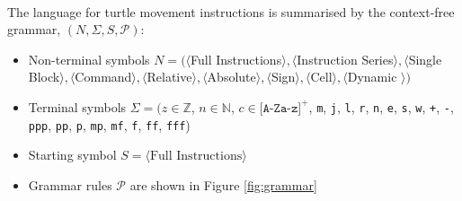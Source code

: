 \paragraph{} The language for turtle movement instructions is summarised by the context-free grammar, $(N,\Sigma,S,\mathcal{P})$:
\begin{itemize}
	\item Non-terminal symbols $N=(\langle$Full Instructions$\rangle, \langle$Instruction Series$\rangle, \langle$Single Block$\rangle, \langle$Command$\rangle, \langle$Relative$\rangle, \langle$Absolute$\rangle, \langle$Sign$\rangle, \langle$Cell$\rangle, \langle$Dynamic $\rangle)$
	\item Terminal symbols $\Sigma=(z{\in}\mathbb{Z}$, $n{\in}\mathbb{N}$, $c{\in}\texttt{[A-Za-z]}^{+}$, \texttt{m}, \texttt{j}, \texttt{l}, \texttt{r}, \texttt{n}, \texttt{e}, \texttt{s}, \texttt{w}, \texttt{+}, \texttt{-}, \texttt{ppp}, \texttt{pp}, \texttt{p}, \texttt{mp}, \texttt{mf}, \texttt{f}, \texttt{ff}, \texttt{fff})
	\item Starting symbol $S = \langle \text{Full Instructions} \rangle$
  \item Grammar rules $\mathcal{P}$ are shown in Figure \ref{fig:grammar}
\end{itemize}

